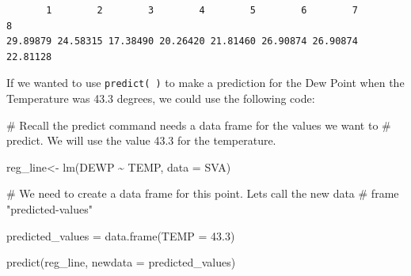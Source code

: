 \documentclass[
  letterpaper,
  DIV=11,
  numbers=noendperiod]{scrreprt}
\newenvironment{Shaded}{\begin{snugshade}}{\end{snugshade}}
\newcommand{\AttributeTok}[1]{\textcolor[rgb]{0.40,0.45,0.13}{#1}}
\newcommand{\CommentTok}[1]{\textcolor[rgb]{0.37,0.37,0.37}{#1}}
\newcommand{\DecValTok}[1]{\textcolor[rgb]{0.68,0.00,0.00}{#1}}
\newcommand{\FloatTok}[1]{\textcolor[rgb]{0.68,0.00,0.00}{#1}}
\newcommand{\FunctionTok}[1]{\textcolor[rgb]{0.28,0.35,0.67}{#1}}
\newcommand{\NormalTok}[1]{\textcolor[rgb]{0.00,0.23,0.31}{#1}}
\newcommand{\OtherTok}[1]{\textcolor[rgb]{0.00,0.23,0.31}{#1}}
\newcommand{\SpecialCharTok}[1]{\textcolor[rgb]{0.37,0.37,0.37}{#1}}
\begin{document}
\begin{Shaded}
\end{Shaded}

\begin{verbatim}
       1        2        3        4        5        6        7        8 
29.89879 24.58315 17.38490 20.26420 21.81460 26.90874 26.90874 22.81128 
\end{verbatim}

If we wanted to use \texttt{predict(\ )} to make a prediction for the
Dew Point when the Temperature was 43.3 degrees, we could use the
following code:

\begin{Shaded}
\begin{Highlighting}[]
\CommentTok{\# Recall the predict command needs a data frame for the values we want to}
\CommentTok{\# predict. We will use the value 43.3 for the temperature.}

\NormalTok{reg\_line}\OtherTok{\textless{}{-}} \FunctionTok{lm}\NormalTok{(DEWP }\SpecialCharTok{\textasciitilde{}}\NormalTok{ TEMP, }\AttributeTok{data =}\NormalTok{ SVA)}

\CommentTok{\# We need to create a data frame for this point. Let\textquotesingle{}s call the new data}
\CommentTok{\# frame "predicted{-}values" }

\NormalTok{predicted\_values }\OtherTok{=} \FunctionTok{data.frame}\NormalTok{(}\AttributeTok{TEMP =} \FloatTok{43.3}\NormalTok{)}

\FunctionTok{predict}\NormalTok{(reg\_line, }\AttributeTok{newdata =}\NormalTok{ predicted\_values)}
\end{Highlighting}
\end{Shaded}
\end{document}

